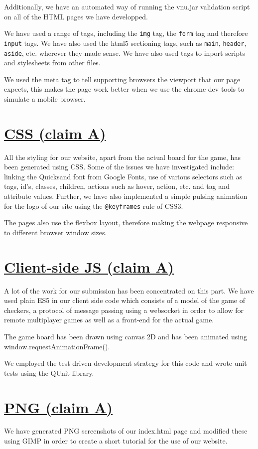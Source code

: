 \documentclass{article}
\begin{document}
    \indent Additionally, we have an automated way of running the vnu.jar validation script on all of the HTML pages we have developped.

    \indent We have used a range of tags, including the \verb|img| tag, the \verb|form| tag and therefore \verb|input| tags. We have also used the
    html5 sectioning tags, such as \verb|main|, \verb|header|, \verb|aside|, etc. wherever they made sense. We have also used tags to inport scripts
    and stylesheets from other files.

    \indent We used the meta tag to tell supporting browsers the viewport that our page expects, this makes the page work better when we use the chrome
    dev tools to simulate a mobile browser.
\section{\underline{CSS (claim A)}}\label{sec:CSS}
    All the styling for our website, apart from the actual board for the game, has been generated using CSS. Some of the issues we have
    investigated include: linking the Quicksand font from Google Fonts, use of various selectors such as tags, id's, classes, children,
    actions such as hover, action, etc. and tag and attribute values. Further, we have also implemented a simple pulsing animation for the logo
    of our site using the \verb|@keyframes| rule of CSS3.

    \indent The pages also use the flexbox layout, therefore making the webpage responsive to different browser window sizes.
\section{\underline{Client-side JS (claim A)}}\label{sec:clientJS}
    A lot of the work for our submission has been concentrated on this part. We have used plain ES5 in our client side code which consists of a model of the game of checkers,
    a protocol of message passing using a websocket in order to allow for remote multiplayer games as well as a front-end for the actual game.

    \indent The game board has been drawn using canvas 2D and has been animated using window.requestAnimationFrame().

    \indent We employed the test driven development strategy for this code and wrote unit tests using the QUnit library.
\section{\underline{PNG (claim A)}}\label{sec:PNG}
    We have generated PNG screenshots of our index.html page and modified these using GIMP in order to create a short tutorial for the use of our website.
\end{document}
